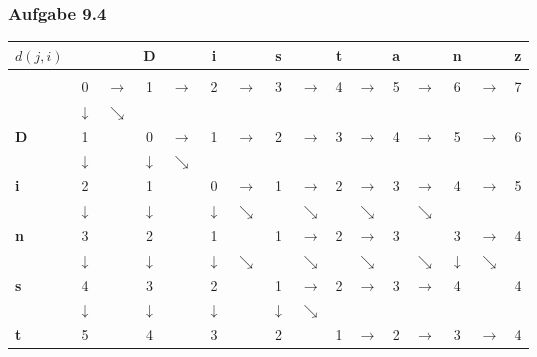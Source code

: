 \documentclass{beamer}
\begin{document}
\begin{frame} \frametitle{Aufgabe 9.4}
		\centering
		\renewcommand*{\arraystretch}{.7}
		\setlength{\tabcolsep}{3pt}
			\begin{tabular}{l|ccccccccccccccc}
				$d(j,i)$ &       &       & \textbf{D} &       & \textbf{i} &       & \textbf{s} &       & \textbf{t} &       & \textbf{a} &       & \textbf{n} &       & \textbf{z} \\ \hline \\
				& 0     & $\rightarrow$ & 1     & $\rightarrow$ & 2     & $\rightarrow$ & 3     & $\rightarrow$ & 4     & $\rightarrow$ & 5     & $\rightarrow$ & 6     & $\rightarrow$ & 7 \\
				& $\downarrow$ & $\searrow$ &       &       &       &       &       &       &       &       &       &       &       &       &  \\
				\textbf{D}     & 1     &       & 0     & $\rightarrow$ & 1     & $\rightarrow$ & 2     & $\rightarrow$ & 3     & $\rightarrow$ & 4     & $\rightarrow$ & 5     & $\rightarrow$ & 6 \\
				& $\downarrow$ &       & $\downarrow$ & $\searrow$ &       &       &       &       &       &       &       &       &       &       &  \\
				\textbf{i}     & 2     &       & 1     &       & 0     & $\rightarrow$ & 1     & $\rightarrow$ & 2     & $\rightarrow$ & 3     & $\rightarrow$ & 4     & $\rightarrow$ & 5 \\
				& $\downarrow$ &       & $\downarrow$ &       & $\downarrow$ & $\searrow$ &       & $\searrow$ &       & $\searrow$ &       & $\searrow$ &       &       &  \\
				\textbf{n}     & 3     &       & 2     &       & 1     &       & 1     & $\rightarrow$ & 2     & $\rightarrow$ & 3     &       & 3     & $\rightarrow$ & 4 \\
				& $\downarrow$ &       & $\downarrow$ &       & $\downarrow$ & $\searrow$ &       & $\searrow$ &       & $\searrow$ &       & $\searrow$ & $\downarrow$ & $\searrow$ &  \\
				\textbf{s}     & 4     &       & 3     &       & 2     &       & 1     & $\rightarrow$ & 2     & $\rightarrow$ & 3     & $\rightarrow$ & 4     &       & 4 \\
				& $\downarrow$ &       & $\downarrow$ &       & $\downarrow$ &       & $\downarrow$ & $\searrow$ &       &       &       &       &       &       &  \\
				\textbf{t}     & 5     &       & 4     &       & 3     &       & 2     &       & 1     & $\rightarrow$ & 2     & $\rightarrow$ & 3     & $\rightarrow$ & 4 \\

\end{tabular}
\end{frame}
\end{document}
